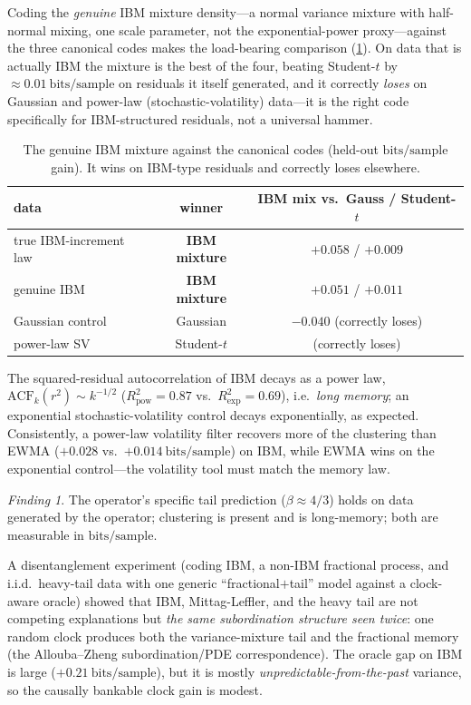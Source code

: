 \documentclass[11pt,reqno]{amsart}
\theoremstyle{plain}
\theoremstyle{definition}
\theoremstyle{remark}
\newtheorem*{finding}{Finding}
\newcommand{\bps}{\mathrm{bits/sample}}
\begin{document}
Coding the \emph{genuine} IBM mixture density---a normal variance mixture with
half-normal mixing, one scale parameter, not the exponential-power proxy---against
the three canonical codes makes the load-bearing comparison
(\cref{tab:fourway}). On data that is actually IBM the mixture is the best of the
four, beating Student-$t$ by $\approx0.01~\bps$ on residuals it itself generated,
and it correctly \emph{loses} on Gaussian and power-law (stochastic-volatility)
data---it is the right code specifically for IBM-structured residuals, not a
universal hammer.

\begin{table}[h]
\centering\small
\begin{tabular}{lcc}
\toprule
data & winner & IBM mix vs.\ Gauss / Student-$t$\\
\midrule
true IBM-increment law & \textbf{IBM mixture} & $+0.058$ / $+0.009$\\
genuine IBM            & \textbf{IBM mixture} & $+0.051$ / $+0.011$\\
Gaussian control       & Gaussian             & $-0.040$ (correctly loses)\\
power-law SV           & Student-$t$          & (correctly loses)\\
\bottomrule
\end{tabular}
\caption{The genuine IBM mixture against the canonical codes (held-out $\bps$
gain). It wins on IBM-type residuals and correctly loses elsewhere.}
\label{tab:fourway}
\end{table}

The squared-residual autocorrelation of IBM decays as a power law,
$\mathrm{ACF}_k(r^2)\sim k^{-1/2}$ ($R^2_{\text{pow}}=0.87$ vs.\
$R^2_{\text{exp}}=0.69$), i.e.\ \emph{long memory}; an exponential
stochastic-volatility control decays exponentially, as expected. Consistently,
a power-law volatility filter recovers more of the clustering than EWMA
($+0.028$ vs.\ $+0.014~\bps$) on IBM, while EWMA wins on the exponential
control---the volatility tool must match the memory law.

\begin{finding}
The operator's specific tail prediction ($\beta\approx4/3$) holds on data
generated by the operator; clustering is present and is long-memory; both are
measurable in $\bps$.
\end{finding}

A disentanglement experiment (coding IBM, a non-IBM fractional process, and
i.i.d.\ heavy-tail data with one generic ``fractional$+$tail'' model against a
clock-aware oracle) showed that IBM, Mittag-Leffler, and the heavy tail are not
competing explanations but \emph{the same subordination structure seen twice}:
one random clock produces both the variance-mixture tail and the fractional
memory (the Allouba--Zheng subordination/PDE correspondence). The oracle gap on
IBM is large ($+0.21~\bps$), but it is mostly \emph{unpredictable-from-the-past}
variance, so the causally bankable clock gain is modest.
\end{document}
